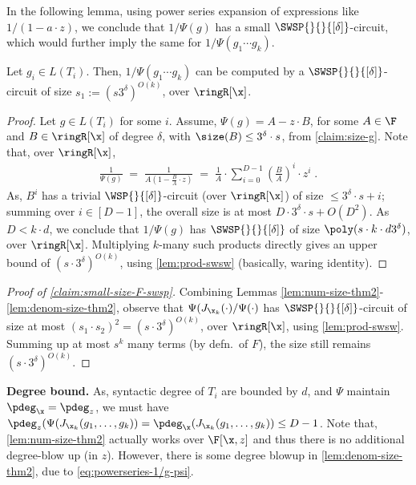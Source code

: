 In the following lemma, using power series expansion of expressions like $1/(1-a\cdot z)$, we conclude that $1/\Psi(g)$ has a small $\SWSP{}{}{[\delta]}$-circuit, which would further imply the same for $1/\Psi(g_1\cdots g_k)$.

\begin{lemma} \label{lem:denom-size-thm2}
Let $g_i \in L(T_i)$. Then, $1/\Psi(g_1\cdots g_k)$ can be computed by a $\SWSP{}{}{[\delta]}$-circuit of size $s_1:=(s3^{\delta})^{O(k)}$, over $\ringR[\x]$.
\end{lemma}

\begin{proof}
Let $g \in L(T_i)$ for some $i$. Assume, $\Psi(g)=A-z\cdot B$, for some $A \in \F$ and $B \in \ringR[\x]$ of degree $\delta$, with $\size(B) \le 3^{\delta} \cdot s$, from \autoref{claim:size-g}. Note that, over $\ringR[\x]$,
\begin{align}
    \frac{1}{\Psi(g)} \;=\; \frac{1}{A(1- \frac{B}{A}\cdot z)}  \;=\; \frac{1}{A} \cdot \sum_{i=0}^{D-1} \left(\frac{B}{A}\right)^{i} \cdot z^i\;.\label{eq:powerseries-1/g-psi}
\end{align}
As, $B^i$ has a trivial $\WSP{}{[\delta]}$-circuit (over $\ringR[\x]$) of size $\le 3^{\delta}\cdot s + i$; summing over $i \in [D-1]$, the overall size is at most $D \cdot 3^{\delta} \cdot s + O(D^2)$. As $D < k \cdot d$, we conclude that $1/\Psi(g)$ has $\SWSP{}{}{[\delta]}$ of size $\poly(s \cdot k \cdot d 3^{\delta})$, over $\ringR[\x]$. Multiplying $k$-many such products directly gives an upper bound of $(s\cdot 3^{\delta})^{O(k)}$, using \autoref{lem:prod-swsw} (basically, waring identity).
\end{proof}

\begin{proof}[Proof of \autoref{claim:small-size-F-swsp}]
Combining Lemmas \ref{lem:num-size-thm2}-\ref{lem:denom-size-thm2}, observe that $\Psi(J_{\x_k}(\cdot)/\Psi(\cdot)$ has $\SWSP{}{}{[\delta]}$-circuit of size at most $(s_1 \cdot s_2)^2 = (s \cdot 3^{\delta})^{O(k)}$, over $\ringR[\x]$, using \autoref{lem:prod-swsw}. Summing up at most $s^k$ many terms (by defn.~of $F$), the size still remains $(s\cdot 3^{\delta})^{O(k)}$.
\end{proof}

{\bf \noindent Degree bound.} As, syntactic degree of $T_i$ are bounded by $d$, and $\Psi$ maintain $\pdeg_{\x}=\pdeg_{z}$, we must have $\pdeg_{z}(\Psi(J_{\x_k}(g_1,\hdots,g_k)) =\pdeg_{\x}(J_{\x_k}(g_1,\hdots,g_k)) \le D-1$. 
%
Note that, \autoref{lem:num-size-thm2} actually works over $\F[\x,z]$ and thus there is no additional degree-blow up (in $z$). However, there is some degree blowup in \autoref{lem:denom-size-thm2}, due to \autoref{eq:powerseries-1/g-psi}.


